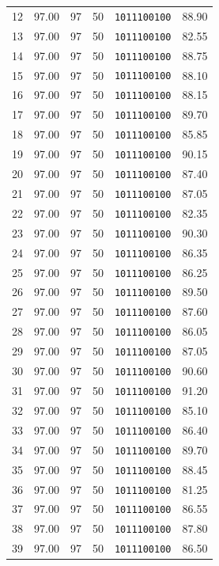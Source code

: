\documentclass[12pt,a4paper]{article}
\begin{document}
{\begin{longtable}{c c c c c c}
12 & 97.00 & 97 & 50 & \texttt{1011100100} & 88.90 \\
13 & 97.00 & 97 & 50 & \texttt{1011100100} & 82.55 \\
14 & 97.00 & 97 & 50 & \texttt{1011100100} & 88.75 \\
15 & 97.00 & 97 & 50 & \texttt{1011100100} & 88.10 \\
16 & 97.00 & 97 & 50 & \texttt{1011100100} & 88.15 \\
17 & 97.00 & 97 & 50 & \texttt{1011100100} & 89.70 \\
18 & 97.00 & 97 & 50 & \texttt{1011100100} & 85.85 \\
19 & 97.00 & 97 & 50 & \texttt{1011100100} & 90.15 \\
20 & 97.00 & 97 & 50 & \texttt{1011100100} & 87.40 \\
21 & 97.00 & 97 & 50 & \texttt{1011100100} & 87.05 \\
22 & 97.00 & 97 & 50 & \texttt{1011100100} & 82.35 \\
23 & 97.00 & 97 & 50 & \texttt{1011100100} & 90.30 \\
24 & 97.00 & 97 & 50 & \texttt{1011100100} & 86.35 \\
25 & 97.00 & 97 & 50 & \texttt{1011100100} & 86.25 \\
26 & 97.00 & 97 & 50 & \texttt{1011100100} & 89.50 \\
27 & 97.00 & 97 & 50 & \texttt{1011100100} & 87.60 \\
28 & 97.00 & 97 & 50 & \texttt{1011100100} & 86.05 \\
29 & 97.00 & 97 & 50 & \texttt{1011100100} & 87.05 \\
30 & 97.00 & 97 & 50 & \texttt{1011100100} & 90.60 \\
31 & 97.00 & 97 & 50 & \texttt{1011100100} & 91.20 \\
32 & 97.00 & 97 & 50 & \texttt{1011100100} & 85.10 \\
33 & 97.00 & 97 & 50 & \texttt{1011100100} & 86.40 \\
34 & 97.00 & 97 & 50 & \texttt{1011100100} & 89.70 \\
35 & 97.00 & 97 & 50 & \texttt{1011100100} & 88.45 \\
36 & 97.00 & 97 & 50 & \texttt{1011100100} & 81.25 \\
37 & 97.00 & 97 & 50 & \texttt{1011100100} & 86.55 \\
38 & 97.00 & 97 & 50 & \texttt{1011100100} & 87.80 \\
39 & 97.00 & 97 & 50 & \texttt{1011100100} & 86.50 \\

\end{longtable}}
\end{document}
